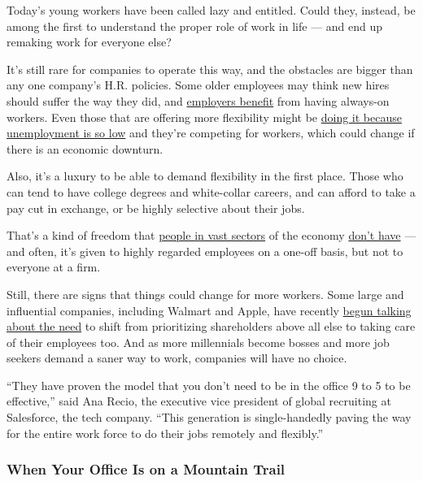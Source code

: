 Today's young workers have been called lazy and entitled. Could they,
instead, be among the first to understand the proper role of work in
life --- and end up remaking work for everyone else?

It's still rare for companies to operate this way, and the obstacles are
bigger than any one company's H.R. policies. Some older employees may
think new hires should suffer the way they did, and
\href{https://www.nytimes3xbfgragh.onion/2015/05/31/upshot/the-24-7-work-cultures-toll-on-families-and-gender-equality.html}{employers
benefit} from having always-on workers. Even those that are offering
more flexibility might be
\href{https://www.nytimes3xbfgragh.onion/2019/05/15/upshot/employers-flexible-work-america.html}{doing
it because unemployment is so low} and they're competing for workers,
which could change if there is an economic downturn.

Also, it's a luxury to be able to demand flexibility in the first place.
Those who can tend to have college degrees and white-collar careers, and
can afford to take a pay cut in exchange, or be highly selective about
their jobs.

That's a kind of freedom that
\href{https://www.nytimes3xbfgragh.onion/2019/09/01/opinion/working-two-jobs.html}{people
in vast sectors} of the economy
\href{https://www.nytimes3xbfgragh.onion/interactive/2014/08/13/us/starbucks-workers-scheduling-hours.html}{don't
have} --- and often, it's given to highly regarded employees on a
one-off basis, but not to everyone at a firm.

Still, there are signs that things could change for more workers. Some
large and influential companies, including Walmart and Apple, have
recently
\href{https://www.nytimes3xbfgragh.onion/2019/08/20/business/dealbook/business-roundtable-corporate-responsibility.html}{begun
talking about the need} to shift from prioritizing shareholders above
all else to taking care of their employees too. And as more millennials
become bosses and more job seekers demand a saner way to work, companies
will have no choice.

``They have proven the model that you don't need to be in the office 9
to 5 to be effective,'' said Ana Recio, the executive vice president of
global recruiting at Salesforce, the tech company. ``This generation is
single-handedly paving the way for the entire work force to do their
jobs remotely and flexibly.''

\hypertarget{when-your-office-is-on-a-mountain-trail}{%
\subsubsection{When Your Office Is on a Mountain
Trail}\label{when-your-office-is-on-a-mountain-trail}}

